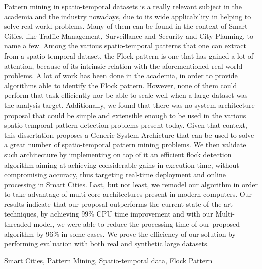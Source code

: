 Pattern mining in spatio-temporal datasets is a really relevant subject in the academia and the industry nowadays, due
to its wide applicability in helping to solve real world problems. Many of them can be found in the context of Smart
Cities, like Traffic Management, Surveillance and Security and City Planning, to name a few. Among the various
spatio-temporal patterns that one can extract from a spatio-temporal dataset, the Flock pattern is one that has gained a
lot of attention, because of its intrinsic relation with the aforementioned real world problems. A lot of work has been
done in the academia, in order to provide algorithms able to identify the Flock pattern. However, none of them could
perform that task efficiently nor be able to scale well when a large dataset was the analysis target. Additionally, we
found that there was no system architecture proposal that could be simple and extensible enough to be used in the
various spatio-temporal pattern detection problems present today. Given that context, this dissertation proposes a
Generic System Archicture that can be used to solve a great number of spatio-temporal pattern mining problems. We then
validate such architecture by implementing on top of it an efficient flock detection algorithm aiming at achieving
considerable gains in execution time, without compromising accuracy, thus targeting real-time deployment and online
processing in Smart Cities. Last, but not least, we remodel our algorithm in order to take advantage of multi-core
architectures present in modern computers. Our results indicate that our proposal outperforms the current
state-of-the-art techniques, by achieving 99\% CPU time improvement and with our Multi-threaded model, we were able to
reduce the processing time of our proposed algorithm by 96\% in some cases. We prove the efficiency of our solution by
performing evaluation with both real and synthetic large datasets.

\begin{keywords}
Smart Cities, Pattern Mining, Spatio-temporal data, Flock Pattern
\end{keywords}
